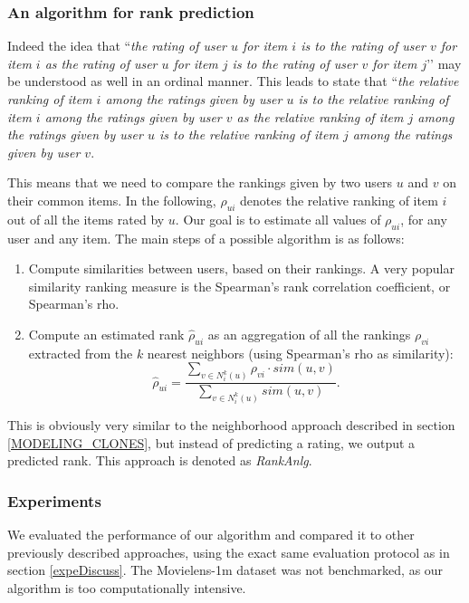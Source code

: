 \subsubsection{An algorithm for rank prediction}
Indeed the idea that ``\textit{the rating of user $u$ for item $i$ is to the
rating of user $v$ for item $i$ as the rating of user $u$ for item $j$ is to
the rating of user $v$ for item $j$}’’ may be understood  as well in an ordinal
manner. This leads to state that ``\textit{the relative ranking of item $i$
  among the ratings given by user $u$  is to the relative ranking of item $i$
  among the ratings given by user $v$ as the relative ranking of item $j$ among
  the ratings given by user $u$  is to the relative ranking of item $j$ among
the ratings given by user $v$}.

This means that we need to compare the rankings given by two users $u$ and $v$
on their common items. In the following, $\rho_{ui}$ denotes the relative
ranking of item $i$ out of all the items rated by $u$. Our goal is to estimate
all values of $\rho_{ui}$, for any user and any item. The main steps of a
possible algorithm is as follows:
\begin{enumerate}
  \item Compute similarities between users, based on their rankings. A very
    popular similarity ranking measure is the Spearman's rank correlation
    coefficient, or Spearman's rho.
  \item Compute an estimated rank $\hat{\rho}_{ui}$ as an aggregation of all the
    rankings $\rho_{vi}$ extracted from the $k$ nearest neighbors (using
    Spearman's rho as similarity):
    $$\hat{\rho}_{ui} = \frac{\sum_{v \in N_i^k(u)} \rho_{vi} \cdot
    sim(u, v)}{\sum_{v \in N_i^k(u)} sim(u, v)}.$$
\end{enumerate}

This is obviously very similar to the neighborhood approach described in
section \ref{MODELING_CLONES}, but instead of predicting a rating, we output a
predicted rank. This approach is denoted as \textit{RankAnlg}.


\subsubsection{Experiments}

We evaluated the performance of our algorithm and compared it to other
previously described approaches, using the exact same evaluation protocol as in
section \ref{expeDiscuss}. The Movielens-1m dataset was not benchmarked, as our
algorithm is too computationally intensive.

